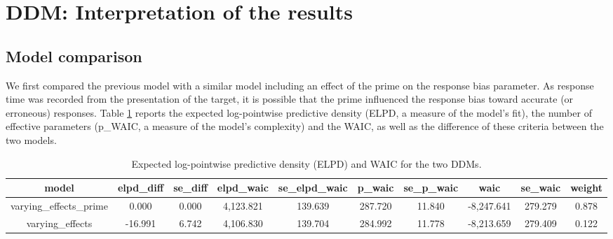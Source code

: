 \documentclass[
  11pt,
  english,
  ,doc,floatsintext]{apa6}
\begin{document}
\hypertarget{ddm-interpretation-of-the-results}{%
\section{DDM: Interpretation of the results}\label{ddm-interpretation-of-the-results}}

\hypertarget{model-comparison}{%
\subsection{Model comparison}\label{model-comparison}}

We first compared the previous model with a similar model including an effect of the prime on the response bias parameter. As response time was recorded from the presentation of the target, it is possible that the prime influenced the response bias toward accurate (or erroneous) responses. Table \ref{tab:model_comparison} reports the expected log-pointwise predictive density (ELPD, a measure of the model's fit), the number of effective parameters (p\_WAIC, a measure of the model's complexity) and the WAIC, as well as the difference of these criteria between the two models.

\begin{table}[htb]

\begin{center}
\begin{threeparttable}

\caption{\label{tab:model_comparison}Expected log-pointwise predictive density (ELPD) and WAIC for the two DDMs.}

\tiny{

\begin{tabular}{cccccccccc}
\toprule
model & \multicolumn{1}{c}{elpd\_diff} & \multicolumn{1}{c}{se\_diff} & \multicolumn{1}{c}{elpd\_waic} & \multicolumn{1}{c}{se\_elpd\_waic} & \multicolumn{1}{c}{p\_waic} & \multicolumn{1}{c}{se\_p\_waic} & \multicolumn{1}{c}{waic} & \multicolumn{1}{c}{se\_waic} & \multicolumn{1}{c}{weight}\\
\midrule
varying\_effects\_prime & 0.000 & 0.000 & 4,123.821 & 139.639 & 287.720 & 11.840 & -8,247.641 & 279.279 & 0.878\\
varying\_effects & -16.991 & 6.742 & 4,106.830 & 139.704 & 284.992 & 11.778 & -8,213.659 & 279.409 & 0.122\\
\bottomrule
\end{tabular}

}

\end{threeparttable}
\end{center}

\end{table}
\end{document}
